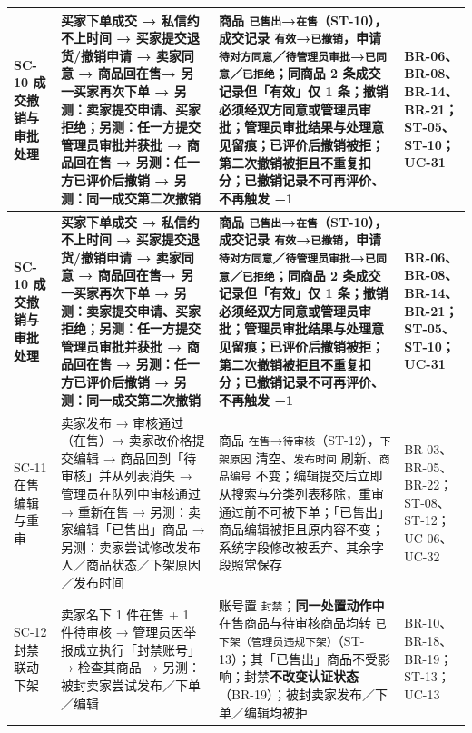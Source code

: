 \documentclass[12pt,a4paper]{ctexart}
\begin{document}
{\scriptsize
\begin{longtable}{|p{1.52cm}|p{5.87cm}|p{6.72cm}|p{1.89cm}|}
\hline
\textbf{SC-10 成交撤销与审批处理} & \textbf{买家下单成交 → 私信约不上时间 → 买家提交退货/撤销申请 → 卖家同意 → 商品回在售→ 另一买家再次下单 → 另测：卖家提交申请、买家拒绝；另测：任一方提交管理员审批并获批 → 商品回在售 → 另测：任一方已评价后撤销 → 另测：同一成交第二次撤销} & \textbf{商品 \texttt{已售出}→\texttt{在售}（ST-10），成交记录 \texttt{有效}→\texttt{已撤销}，申请 \texttt{待对方同意}／\texttt{待管理员审批}→\texttt{已同意}／\texttt{已拒绝}；同商品 \textbf{2 条成交记录但「有效」仅 1 条}；\textbf{撤销必须经双方同意或管理员审批}；管理员审批结果与处理意见留痕；已评价后撤销被拒；第二次撤销被拒且不重复扣分；已撤销记录不可再评价、不再触发 −1} & \textbf{BR-06、BR-08、BR-14、BR-21；ST-05、ST-10；UC-31} \\
\hline
\endfirsthead
\hline
\textbf{SC-10 成交撤销与审批处理} & \textbf{买家下单成交 → 私信约不上时间 → 买家提交退货/撤销申请 → 卖家同意 → 商品回在售→ 另一买家再次下单 → 另测：卖家提交申请、买家拒绝；另测：任一方提交管理员审批并获批 → 商品回在售 → 另测：任一方已评价后撤销 → 另测：同一成交第二次撤销} & \textbf{商品 \texttt{已售出}→\texttt{在售}（ST-10），成交记录 \texttt{有效}→\texttt{已撤销}，申请 \texttt{待对方同意}／\texttt{待管理员审批}→\texttt{已同意}／\texttt{已拒绝}；同商品 \textbf{2 条成交记录但「有效」仅 1 条}；\textbf{撤销必须经双方同意或管理员审批}；管理员审批结果与处理意见留痕；已评价后撤销被拒；第二次撤销被拒且不重复扣分；已撤销记录不可再评价、不再触发 −1} & \textbf{BR-06、BR-08、BR-14、BR-21；ST-05、ST-10；UC-31} \\
\hline
\endhead
\hline
\endfoot
SC-11 在售编辑与重审 & 卖家发布 → 审核通过（在售）→ 卖家改价格提交编辑 → 商品回到「待审核」并从列表消失 → 管理员在队列中审核通过 → 重新在售 → 另测：卖家编辑「已售出」商品 → 另测：卖家尝试修改发布人／商品状态／下架原因／发布时间 & 商品 \texttt{在售}→\texttt{待审核}（ST-12），\texttt{下架原因} 清空、\texttt{发布时间} 刷新、\texttt{商品编号} 不变；编辑提交后立即从搜索与分类列表移除，重审通过前不可被下单；「已售出」商品编辑被拒且原内容不变；系统字段修改被丢弃、其余字段照常保存 & BR-03、BR-05、BR-22；ST-08、ST-12；UC-06、UC-32 \\
\hline
SC-12 封禁联动下架 & 卖家名下 1 件在售 + 1 件待审核 → 管理员因举报成立执行「封禁账号」→ 检查其商品 → 另测：被封卖家尝试发布／下单／编辑 & 账号置 \texttt{封禁}；\textbf{同一处置动作中}在售商品与待审核商品均转 \texttt{已下架（管理员违规下架）}（ST-13）；其「已售出」商品不受影响；封禁\textbf{不改变认证状态}（BR-19）；被封卖家发布／下单／编辑均被拒 & BR-10、BR-18、BR-19；ST-13；UC-13 \\
\hline
\end{longtable}
}
\end{document}
